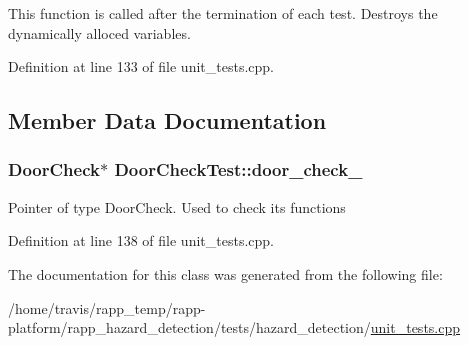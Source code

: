 This function is called after the termination of each test. Destroys the dynamically alloced variables. 



Definition at line 133 of file unit\-\_\-tests.\-cpp.



\subsection{Member Data Documentation}
\hypertarget{classDoorCheckTest_a0837fac7e29727dfc7ddcea7dd37f8e1}{
\subsubsection[{door\-\_\-check\-\_\-}]{\setlength{\rightskip}{0pt plus 5cm}Door\-Check$\ast$ Door\-Check\-Test\-::door\-\_\-check\-\_\-\hspace{0.3cm}{\ttfamily [protected]}}}\label{classDoorCheckTest_a0837fac7e29727dfc7ddcea7dd37f8e1}
Pointer of type Door\-Check. Used to check its functions 

Definition at line 138 of file unit\-\_\-tests.\-cpp.



The documentation for this class was generated from the following file\-:\begin{DoxyCompactItemize}
\item 
/home/travis/rapp\-\_\-temp/rapp-\/platform/rapp\-\_\-hazard\-\_\-detection/tests/hazard\-\_\-detection/\hyperlink{unit__tests_8cpp}{unit\-\_\-tests.\-cpp}\end{DoxyCompactItemize}
